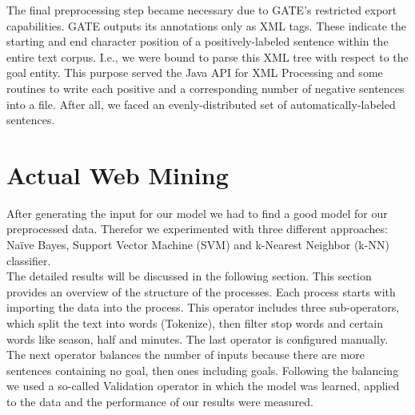 \documentclass[11pt,titlepage,oneside,openany]{book}
\begin{document}
The final preprocessing step became necessary due to GATE's restricted export capabilities. GATE outputs its annotations only as XML tags. These indicate the starting and end character position of a  positively-labeled sentence within the entire text corpus. I.e., we were bound to parse this XML tree with respect to the goal entity. This purpose served the Java API for XML Processing and some routines to write each positive and a corresponding number of negative sentences into a file. After all, we faced an evenly-distributed set of automatically-labeled sentences.

\section{Actual Web Mining}
\label{sec:webmining}
After generating the input for our model we had to find a good model for our preprocessed data. Therefor we experimented with three different approaches: Na\"{i}ve Bayes, Support Vector Machine (SVM) and k-Nearest Neighbor (k-NN) classifier. \\ 
The detailed results will be discussed in the following section. This section provides an overview of the structure of the processes. Each process starts with importing the data into the process.
This operator includes three sub-operators, which split the text into words (Tokenize), then filter stop words and certain words like season, half and minutes. The last operator is configured manually. The next operator balances the number of inputs because there are more sentences containing no goal, then ones including goals. Following the balancing we used a so-called Validation operator in which the model was learned, applied to the data and the performance of our results were measured. \\
\end{document}
